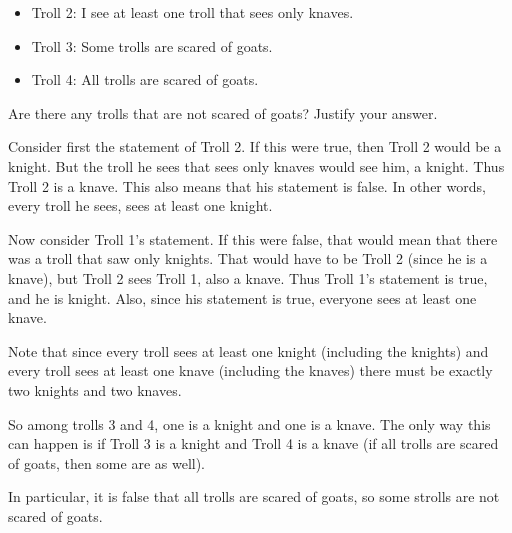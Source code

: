 \documentclass[10pt]{exam}
\begin{document}
\begin{questions}
\begin{itemize}
  \item[] Troll 2: I see at least one troll that sees only knaves.

  \item[] Troll 3: Some trolls are scared of goats.

  \item[] Troll 4: All trolls are scared of goats.
  \end{itemize}

  Are there any trolls that are not scared of goats?  Justify your answer.

  \begin{solution}
  Consider first the statement of Troll 2.  If this were true, then Troll 2 would be a knight.  But the troll he sees that sees only knaves would see him, a knight.  Thus Troll 2 is a knave.  This also means that his statement is false.  In other words, every troll he sees, sees at least one knight.

  Now consider Troll 1's statement.  If this were false, that would mean that there was a troll that saw only knights.  That would have to be Troll 2 (since he is a knave), but Troll 2 sees Troll 1, also a knave.  Thus Troll 1's statement is true, and he is knight.  Also, since his statement is true, everyone sees at least one knave.

  Note that since every troll sees at least one knight (including the knights) and every troll sees at least one knave (including the knaves) there must be exactly two knights and two knaves.

  So among trolls 3 and 4, one is a knight and one is a knave.  The only way this can happen is if Troll 3 is a knight and Troll 4 is a knave (if all trolls are scared of goats, then some are as well).

  In particular, it is false that all trolls are scared of goats, so some strolls are not scared of goats.


  \end{solution}

\end{questions}
\end{document}
